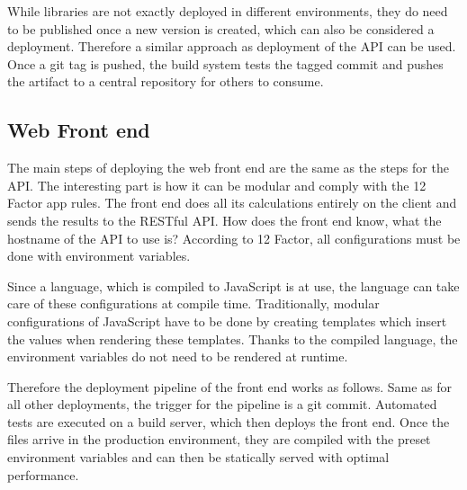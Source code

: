 While libraries are not exactly deployed in different environments, they do
need to be published once a new version is created, which can also be
considered a deployment. Therefore a similar approach as deployment of the API
can be used. Once a git tag is pushed, the build system tests the tagged commit
and pushes the artifact to a central repository for others to consume.

\subsection{Web Front end}

The main steps of deploying the web front end are the same as the steps for the
API. The interesting part is how it can be modular and comply with the 12
Factor app rules. The front end does all its calculations entirely on the client
and sends the results to the RESTful API. How does the front end know, what the
hostname of the API to use is? According to 12 Factor, all configurations must
be done with environment variables.

Since a language, which is compiled to JavaScript is at use, the language can
take care of these configurations at compile time. Traditionally, modular
configurations of JavaScript have to be done by creating templates which insert
the values when rendering these templates. Thanks to the compiled language, the
environment variables do not need to be rendered at runtime.

Therefore the deployment pipeline of the front end works as follows. Same as for
all other deployments, the trigger for the pipeline is a git commit. Automated
tests are executed on a build server, which then deploys the front end. Once the
files arrive in the production environment, they are compiled with the preset
environment variables and can then be statically served with optimal
performance.
